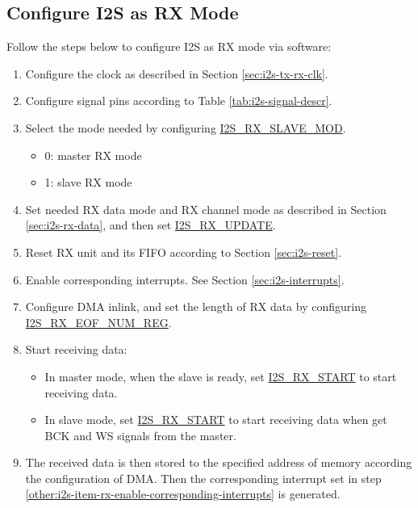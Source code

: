 \documentclass[main\_\_EN.tex]{subfiles}
\begin{document}
\subsection{Configure I2S as RX Mode}\label{sec:i2s-configure-i2s-rx-mode}
Follow the steps below to configure I2S as RX mode via software:

\begin{enumerate}
    \item Configure the clock as described in Section \ref{sec:i2s-tx-rx-clk}.

    \item Configure signal pins according to Table \ref{tab:i2s-signal-descr}.

    \item Select the mode needed by configuring \hyperref[fielddesc:I2SRXSLAVEMOD]{I2S\_RX\_SLAVE\_MOD}.
    \begin{itemize}
        \item 0: master RX mode
        \item 1: slave RX mode
    \end{itemize}
    
    \item Set needed RX data mode and RX channel mode as described in Section \ref{sec:i2s-rx-data}, and then set \hyperref[fielddesc:I2SRXUPDATE]{I2S\_RX\_UPDATE}.

    \item Reset RX unit and its FIFO according to Section \ref{sec:i2s-reset}.
    \item Enable corresponding interrupts. See Section \ref{sec:i2s-interrupts}.\label{other:i2s-item-rx-enable-corresponding-interrupts}
    
    \item Configure DMA inlink, and set the length of RX data by configuring  \hyperref[regdesc:I2SRXEOFNUMREG]{I2S\_RX\_EOF\_NUM\_REG}.

    \item Start receiving data:
    \begin{itemize}
        \item In master mode, when the slave is ready, set  \hyperref[fielddesc:I2SRXSTART]{I2S\_RX\_START} to start receiving data.
        \item In slave mode, set  \hyperref[fielddesc:I2SRXSTART]{I2S\_RX\_START} to start receiving data when get BCK and WS signals from the master.
    \end{itemize}
    \item The received data is then stored to the specified address of \chipname{} memory according the configuration of DMA. Then the corresponding interrupt set in step \ref{other:i2s-item-rx-enable-corresponding-interrupts} is generated.
\end{enumerate}
\end{document}
